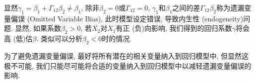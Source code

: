 \documentclass[cn, 12pt, math=mtpro2, bibstyle=apa, blue, twocol]{elegantbook}
\begin{document}
显然$\gamma_1=\beta_1+\Gamma_{12}\beta_2\neq\beta_1$, 除非$\beta_2=0$或$\Gamma_{12}=0$, $\gamma_1$和$\beta_1$之间的差$\Gamma_{12}\beta_2$称为遗漏变量偏误 (Omitted Variable Bias), 此时模型设定错误, 导致内生性 (endogeneity)问题. 显然, 如果系数$\beta_2>0$, 若$X_2$对$X_1$有正 (负)向影响, 我们得到的回归系数$\gamma$将会高 (低)估$\beta$. 类似可以分析$\beta_2<0$时的情况.

为了避免遗漏变量偏误, 最好将所有潜在的相关变量纳入到回归模型中, 但显然这极不可能, 我们只能尽可能将合适的变量纳入到回归模型中以减轻遗漏变量偏误的影响.





\end{document}

